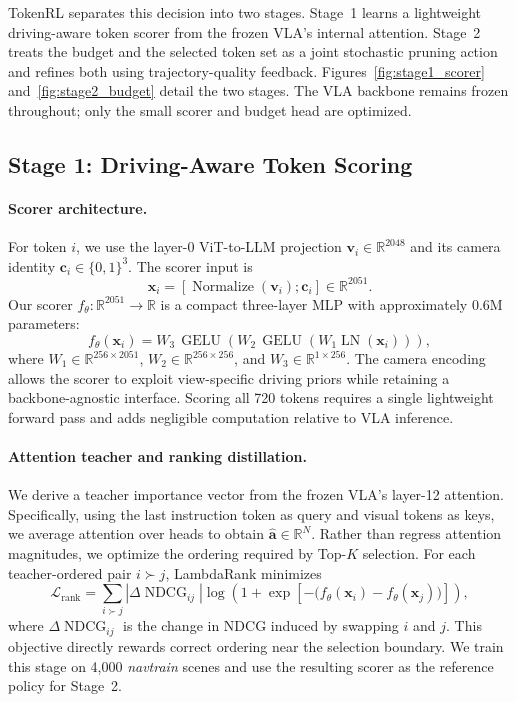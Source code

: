 \documentclass[letterpaper]{article} %
\newcommand{\ours}{TokenRL}
\begin{document}
\ours{} separates this decision into two stages. Stage~1 learns a lightweight driving-aware token scorer from the frozen VLA's internal attention. Stage~2 treats the budget and the selected token set as a joint stochastic pruning action and refines both using trajectory-quality feedback. Figures~\ref{fig:stage1_scorer} and~\ref{fig:stage2_budget} detail the two stages. The VLA backbone remains frozen throughout; only the small scorer and budget head are optimized.

\subsection{Stage 1: Driving-Aware Token Scoring}
\label{sec:sft}

\paragraph{Scorer architecture.}
For token $i$, we use the layer-0 ViT-to-LLM projection $\mathbf{v}_i\in\mathbb{R}^{2048}$ and its camera identity $\mathbf{c}_i\in\{0,1\}^{3}$. The scorer input is
\begin{equation}
    \mathbf{x}_i = [\operatorname{Normalize}(\mathbf{v}_i);\mathbf{c}_i]
    \in\mathbb{R}^{2051}.
\end{equation}
Our scorer $f_\theta:\mathbb{R}^{2051}\to\mathbb{R}$ is a compact three-layer MLP with approximately $0.6$M parameters:
\begin{equation}
 f_\theta(\mathbf{x}_i) = W_3\,\operatorname{GELU}\!\left(
 W_2\,\operatorname{GELU}\!\left(W_1\operatorname{LN}(\mathbf{x}_i)\right)
 \right),
\end{equation}
where $W_1\in\mathbb{R}^{256\times2051}$, $W_2\in\mathbb{R}^{256\times256}$, and $W_3\in\mathbb{R}^{1\times256}$. The camera encoding allows the scorer to exploit view-specific driving priors while retaining a backbone-agnostic interface. Scoring all 720 tokens requires a single lightweight forward pass and adds negligible computation relative to VLA inference.

\paragraph{Attention teacher and ranking distillation.}
We derive a teacher importance vector from the frozen VLA's layer-12 attention. Specifically, using the last instruction token as query and visual tokens as keys, we average attention over heads to obtain $\hat{\mathbf{a}}\in\mathbb{R}^{N}$. Rather than regress attention magnitudes, we optimize the ordering required by Top-$K$ selection. For each teacher-ordered pair $i\succ j$, LambdaRank minimizes
\begin{equation}
\mathcal{L}_{\mathrm{rank}} =
\sum_{i\succ j}\left|\Delta\operatorname{NDCG}_{ij}\right|
\log\!\left(1+\exp\left[-\big(f_\theta(\mathbf{x}_i)-f_\theta(\mathbf{x}_j)\big)\right]\right),
\label{eq:lambdarank}
\end{equation}
where $\Delta\operatorname{NDCG}_{ij}$ is the change in NDCG induced by swapping $i$ and $j$. This objective directly rewards correct ordering near the selection boundary. We train this stage on 4,000 \textit{navtrain} scenes and use the resulting scorer as the reference policy for Stage~2.
\end{document}
